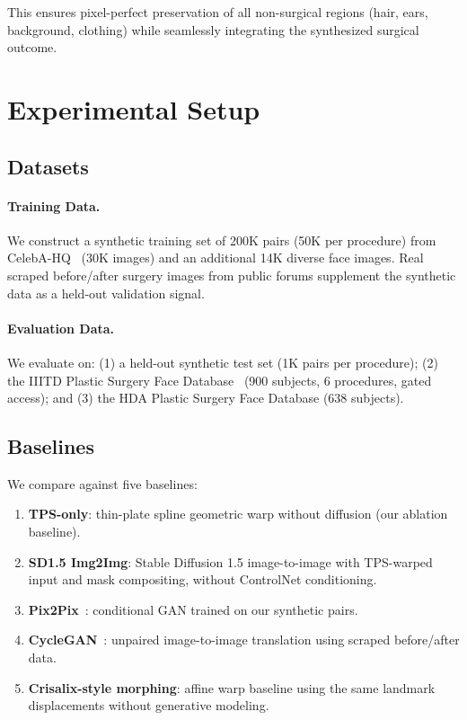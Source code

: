 \documentclass[runningheads]{llncs}
\begin{document}
This ensures pixel-perfect preservation of all non-surgical regions
(hair, ears, background, clothing) while seamlessly integrating the
synthesized surgical outcome.

\section{Experimental Setup}
\label{sec:experiments}

\subsection{Datasets}

\paragraph{Training Data.}
We construct a synthetic training set of 200K pairs (50K per procedure)
from CelebA-HQ~\cite{karras2018celeba} (30K images) and an additional
14K diverse face images.  Real scraped before/after surgery images from
public forums supplement the synthetic data as a held-out validation
signal.

\paragraph{Evaluation Data.}
We evaluate on: (1) a held-out synthetic test set (1K pairs per procedure);
(2) the IIITD Plastic Surgery Face Database~\cite{singh2010plastic}
(900 subjects, 6 procedures, gated access); and (3) the HDA Plastic
Surgery Face Database (638 subjects).

\subsection{Baselines}

We compare against five baselines:
\begin{enumerate}
    \item \textbf{TPS-only}: thin-plate spline geometric warp without
    diffusion (our ablation baseline).
    \item \textbf{SD1.5 Img2Img}: Stable Diffusion 1.5 image-to-image
    with TPS-warped input and mask compositing, without ControlNet
    conditioning.
    \item \textbf{Pix2Pix}~\cite{isola2017pix2pix}: conditional GAN
    trained on our synthetic pairs.
    \item \textbf{CycleGAN}~\cite{zhu2017cyclegan}: unpaired
    image-to-image translation using scraped before/after data.
    \item \textbf{Crisalix-style morphing}: affine warp baseline using
    the same landmark displacements without generative modeling.
\end{enumerate}
\end{document}
